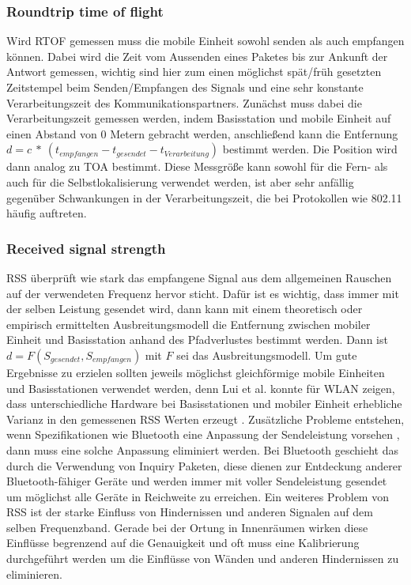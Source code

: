\subsubsection{Roundtrip time of flight}
Wird RTOF gemessen muss die mobile Einheit sowohl senden als auch empfangen können. Dabei wird die Zeit vom Aussenden eines Paketes bis zur Ankunft der Antwort gemessen, wichtig sind hier zum einen möglichst spät/früh gesetzten Zeitstempel beim Senden/Empfangen des Signals und eine sehr konstante Verarbeitungszeit des Kommunikationspartners. Zunächst muss dabei die Verarbeitungszeit gemessen werden, indem Basisstation und mobile Einheit auf einen Abstand von 0 Metern gebracht werden, anschließend kann die Entfernung $d = c\ *\ (t_{empfangen} - t_{gesendet} - t_{Verarbeitung})$ bestimmt werden. Die Position wird dann analog zu TOA bestimmt. Diese Messgröße kann sowohl für die Fern- als auch für die Selbstlokalisierung verwendet werden, ist aber sehr anfällig gegenüber Schwankungen in der Verarbeitungszeit, die bei Protokollen wie 802.11 häufig auftreten. \\

\subsubsection{Received signal strength}
RSS überprüft wie stark das empfangene Signal aus dem allgemeinen Rauschen auf der verwendeten Frequenz hervor sticht. Dafür ist es wichtig, dass immer mit der selben Leistung gesendet wird, dann kann mit einem theoretisch oder empirisch ermittelten Ausbreitungsmodell die Entfernung zwischen mobiler Einheit und Basisstation anhand des Pfadverlustes bestimmt werden. Dann ist $d = F(S_{gesendet},S_{empfangen})$ mit $F$ sei das Ausbreitungsmodell. Um gute Ergebnisse zu erzielen sollten jeweils möglichst gleichförmige mobile Einheiten und Basisstationen verwendet werden, denn Lui et al. konnte für WLAN zeigen, dass unterschiedliche Hardware bei Basisstationen und mobiler Einheit erhebliche Varianz in den gemessenen RSS Werten erzeugt \cite{lui2011differences}. Zusätzliche Probleme entstehen, wenn Spezifikationen wie Bluetooth eine Anpassung der Sendeleistung vorsehen \cite{hossain2007comprehensive}, dann muss eine solche Anpassung eliminiert werden. 
Bei Bluetooth geschieht das durch die Verwendung von Inquiry Paketen, diese dienen zur Entdeckung anderer Bluetooth-fähiger Geräte und werden immer mit voller Sendeleistung gesendet um möglichst alle Geräte in Reichweite zu erreichen.
Ein weiteres Problem von RSS ist der starke Einfluss von Hindernissen und anderen  Signalen auf dem selben Frequenzband. Gerade bei der Ortung in Innenräumen wirken diese Einflüsse begrenzend auf die Genauigkeit und oft muss eine Kalibrierung durchgeführt werden um die Einflüsse von Wänden und anderen Hindernissen zu eliminieren.



